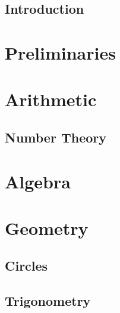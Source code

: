 



\frontmatter
\maketitle
\blankpage

\setcounter{tocdepth}{1}
\tableofcontents
\listoffigures
\listoftables
\listoftheorems

\chapter{Introduction}

\mainmatter
\part{Preliminaries}\label{pt:prelim}

    
    
    
    
\part{Arithmetic}\label{pt:arithmetic}

    
    
    \chapter{Number Theory}\label{ch:num}

\part{Algebra}\label{pt:alg}

\part{Geometry}\label{pt:geo}

    \chapter{Circles}\label{ch:circles}

    \chapter{Trigonometry}\label{ch:trig}

